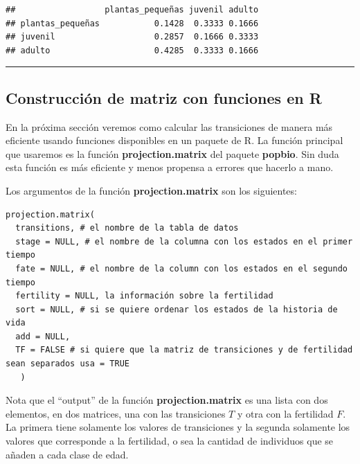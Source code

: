 \documentclass[
]{book}
\newenvironment{Shaded}{\begin{snugshade}}{\end{snugshade}}
\newcommand{\AttributeTok}[1]{\textcolor[rgb]{0.13,0.29,0.53}{#1}}
\newcommand{\CommentTok}[1]{\textcolor[rgb]{0.56,0.35,0.01}{\textit{#1}}}
\newcommand{\ConstantTok}[1]{\textcolor[rgb]{0.56,0.35,0.01}{#1}}
\newcommand{\DecValTok}[1]{\textcolor[rgb]{0.00,0.00,0.81}{#1}}
\newcommand{\FunctionTok}[1]{\textcolor[rgb]{0.13,0.29,0.53}{\textbf{#1}}}
\newcommand{\NormalTok}[1]{#1}
\newcommand{\OtherTok}[1]{\textcolor[rgb]{0.56,0.35,0.01}{#1}}
\newcommand{\SpecialCharTok}[1]{\textcolor[rgb]{0.81,0.36,0.00}{\textbf{#1}}}
\newcommand{\StringTok}[1]{\textcolor[rgb]{0.31,0.60,0.02}{#1}}
\theoremstyle{definition}
\theoremstyle{definition}
\theoremstyle{definition}
\theoremstyle{definition}
\theoremstyle{remark}
\begin{document}
\begin{verbatim}
##                  plantas_pequeñas juvenil adulto
## plantas_pequeñas           0.1428  0.3333 0.1666
## juvenil                    0.2857  0.1666 0.3333
## adulto                     0.4285  0.3333 0.1666
\end{verbatim}

\begin{center}\rule{0.5\linewidth}{0.5pt}\end{center}

\subsection{Construcción de matriz con funciones en R}\label{construcciuxf3n-de-matriz-con-funciones-en-r}

En la próxima sección veremos como calcular las transiciones de manera más eficiente usando funciones disponibles en un paquete de R. La función principal que usaremos es la función \textbf{projection.matrix} del paquete \textbf{popbio}. Sin duda esta función es más eficiente y menos propensa a errores que hacerlo a mano.

Los argumentos de la función \textbf{projection.matrix} son los siguientes:

\begin{verbatim}
projection.matrix(
  transitions, # el nombre de la tabla de datos
  stage = NULL, # el nombre de la columna con los estados en el primer tiempo
  fate = NULL, # el nombre de la column con los estados en el segundo tiempo
  fertility = NULL, la información sobre la fertilidad
  sort = NULL, # si se quiere ordenar los estados de la historia de vida
  add = NULL,
  TF = FALSE # si quiere que la matriz de transiciones y de fertilidad sean separados usa = TRUE 
   )
\end{verbatim}

Nota que el ``output'' de la función \textbf{projection.matrix} es una lista con dos elementos, en dos matrices, una con las transiciones \(T\) y otra con la fertilidad \(F\). La primera tiene solamente los valores de transiciones y la segunda solamente los valores que corresponde a la fertilidad, o sea la cantidad de individuos que se añaden a cada clase de edad.

\begin{Shaded}
\end{Shaded}
\end{document}
